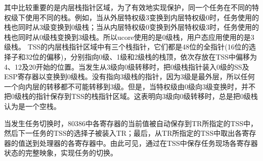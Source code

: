 其中比较重要的是内层栈指针区域，为了有效地实现保护，同一个任务在不同的特权级下使用不同的栈。例如，当从外层特权级3变换到内层特权级0时，任务使用的栈也同时从3级变换到0级栈；当从内层特权级0变换到外层特权级3时，任务使用的栈也同时从0级栈变换到3级栈。所以ucore使用的是0级栈，用户态应用使用的是3级栈。
TSS的内层栈指针区域中有三个栈指针，它们都是48位的全指针(16位的选择子和32位的偏移)，分别指向0级、1级和2级栈的栈顶，依次存放在TSS中偏移为4、12及20开始的位置。当发生从3级向0级转移时，把0级栈指针装入0级的SS及ESP寄存器以变换到0级栈。没有指向3级栈的指针，因为3级是最外层，所以任何一个向内层的转移都不可能转移到3级。但是，当特权级由0级向3级变换时，并不把0级栈的指针保存到TSS的栈指针区域。这表明向3级向0级转移时，总是把0级栈认为是一个空栈。

当发生任务切换时，80386中各寄存器的当前值被自动保存到TR所指定的TSS中，然后下一任务的TSS的选择子被装入TR；最后，从TR所指定的TSS中取出各寄存器的值送到处理器的各寄存器中。由此可见，通过在TSS中保存任务现场各寄存器状态的完整映象，实现任务的切换。
